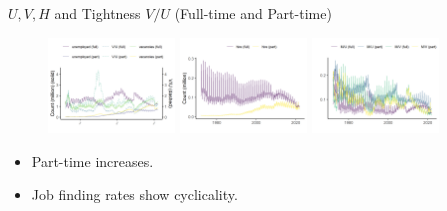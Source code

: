 \documentclass[aspectratio=169]{beamer}
\begin{document}
\begin{frame}{$U,V,H$ and Tightness $V/U$ (Full-time and Part-time)}
    \begin{figure}[!ht]
  \begin{center}
  \includegraphics[width = 0.3\textwidth]
  {figuretable/unemployed_vacancy_month_full_time_part_time.png}
  \includegraphics[width = 0.3\textwidth]
  {figuretable/hire_month_full_time_part_time.png}
  \includegraphics[width = 0.3\textwidth]
  {figuretable/job_finding_rate_worker_finding_rate_month_full_time_part_time.png}
  \end{center}
  \footnotesize
\end{figure} 
\begin{itemize}
    \item Part-time increases.
    \item Job finding rates show cyclicality.
\end{itemize}

\end{frame}
\end{document}
